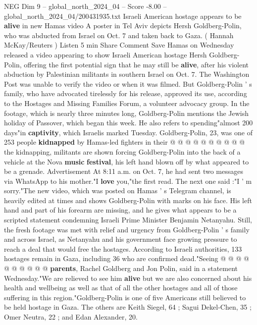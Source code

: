 \begin{textsample}{NEG Dim 9 – global\_north\_2024\_04 – Score -8.00 – global\_north\_2024\_04/200431935.txt}  \label{ex:f9_neg_263}
Israeli American hostage appears to be \textbf{alive} in new Hamas video A poster in Tel Aviv depicts Hersh Goldberg-Polin, who was abducted from Israel on Oct. 7 and taken back to Gaza. ( Hannah McKay/Reuters ) Listen 5 min Share Comment Save Hamas on Wednesday released a video appearing to show Israeli American hostage Hersh Goldberg-Polin, offering the first potential sign that he may still be \textbf{alive}, after his violent abduction by Palestinian militants in southern Israel on Oct. 7.
The Washington Post was unable to verify the video or when it was filmed.
But Goldberg-Polin ' s family, who have advocated tirelessly for his release, approved its use, according to the Hostages and Missing Families Forum, a volunteer advocacy group.
In the footage, which is nearly three minutes long, Goldberg-Polin mentions the Jewish holiday of Passover, which began this week.
He also refers to spending"almost 200 days"in \textbf{captivity}, which Israelis marked Tuesday.
Goldberg-Polin, 23, was one of 253 people \textbf{kidnapped} by Hamas-led fighters in their @ @ @ @ @ @ @ @ @ @ the kidnapping, militants are shown forcing Goldberg-Polin into the back of a vehicle at the Nova \textbf{music} \textbf{festival}, his left hand blown off by what appeared to be a grenade.
Advertisement At 8:11 a.m. on Oct. 7, he had sent two messages via WhatsApp to his mother."I \textbf{love} you,"the first read.
The next one said :"I ' m sorry."The new video, which was posted on Hamas ' s Telegram channel, is heavily edited at times and shows Goldberg-Polin with marks on his face.
His left hand and part of his forearm are missing, and he gives what appears to be a scripted statement condemning Israeli Prime Minister Benjamin Netanyahu.
Still, the fresh footage was met with relief and urgency from Goldberg-Polin ' s family and across Israel, as Netanyahu and his government face growing pressure to reach a deal that would free the hostages.
According to Israeli authorities, 133 hostages remain in Gaza, including 36 who are confirmed dead."Seeing @ @ @ @ @ @ @ @ @ @ \textbf{parents}, Rachel Goldberg and Jon Polin, said in a statement Wednesday."We are relieved to see him \textbf{alive} but we are also concerned about his health and wellbeing as well as that of all the other hostages and all of those suffering in this region."Goldberg-Polin is one of five Americans still believed to be held hostage in Gaza.
The others are Keith Siegel, 64 ; Sagui Dekel-Chen, 35 ; Omer Neutra, 22 ; and Edan Alexander, 20.

\end{textsample}
